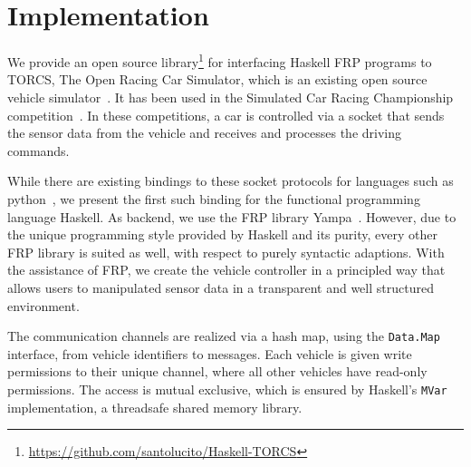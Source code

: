 \section{Implementation}

We provide an open source library\footnote{\url{https://github.com/santolucito/Haskell-TORCS}} for interfacing Haskell FRP programs to TORCS, The Open Racing Car Simulator, which is an existing open source vehicle simulator~\cite{torcs}.
It has been used in the Simulated Car Racing Championship competition~\cite{SCRC}.
In these competitions, a car is controlled via a socket that sends the sensor data from the vehicle and receives and processes the driving commands.

While there are existing bindings to these socket protocols for languages such as python~\cite{snakeoil,pyscrc}, we present the first such binding for the functional programming language Haskell. 
As backend, we use the FRP library Yampa~\cite{courtney2003yampa}. 
However, due to the unique programming style provided by Haskell and its purity, every other FRP library is suited as well, with respect to purely syntactic adaptions.
With the assistance of FRP, we create the  vehicle controller in a principled way that allows users to manipulated sensor data in a transparent and well structured environment.



The communication channels are realized via a hash map, using the \texttt{Data.Map} interface, from vehicle identifiers to messages.
Each vehicle is given write permissions to their unique channel, where all other vehicles have read-only permissions.
The access is mutual exclusive, which is ensured by Haskell's \texttt{MVar} implementation, a threadsafe shared memory library. %
